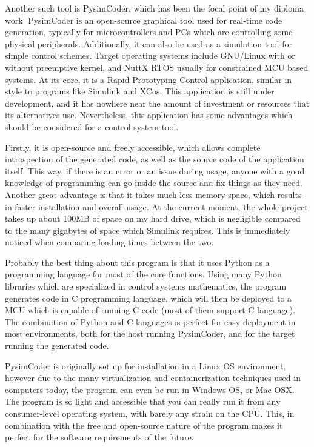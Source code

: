 \quad Another such tool is PysimCoder, which has been the focal point of my diploma work. PysimCoder is an open-source graphical 
tool used for real-time code generation, typically for microcontrollers and PCs which are controlling some physical peripherals.
Additionally, it can also be used as a simulation tool for simple control schemes. Target operating systems include GNU/Linux with or
without preemptive kernel, and NuttX RTOS usually for constrained MCU based systems. At its core, it is a Rapid Prototyping Control
application, similar in style to programs like Simulink and XCos. This application is still under development, and it has nowhere
near the amount of investment or resources that its alternatives use. Nevertheless, this application has some advantages which should
be considered for a control system tool. 

\quad Firstly, it is open-source and freely accessible, which allows complete introspection of the generated code, as well as the
source code of the application itself. This way, if there is an error or an issue during usage, anyone with a good knowledge of
programming can go inside the source and fix things as they need. Another great advantage is that it takes much less memory space,
which results in faster installation and overall usage. At the current moment, the whole project takes up about 100MB of space on my
hard drive, which is negligible compared to the many gigabytes of space which Simulink requires. This is immediately noticed when
comparing loading times between the two. 

\quad Probably the best thing about this program is that it uses Python as a programming language for most of the core functions.
Using many Python libraries which are specialized in control systems mathematics, the program generates code in C programming
language, which will then be deployed to a MCU which is capable of running C-code (most of them support C language). The combination
of Python and C languages is perfect for easy deployment in most environments, both for the host running PysimCoder, and for the
target running the generated code. 

\quad PysimCoder is originally set up for installation in a Linux OS environment, however due to the many virtualization and
containerization techniques used in computers today, the program can even be run in Windows OS, or Mac OSX. The program is so light
and accessible that you can really run it from any consumer-level operating system, with barely any strain on the CPU. This, in
combination with the free and open-source nature of the program makes it perfect for the software requirements of the future. 

